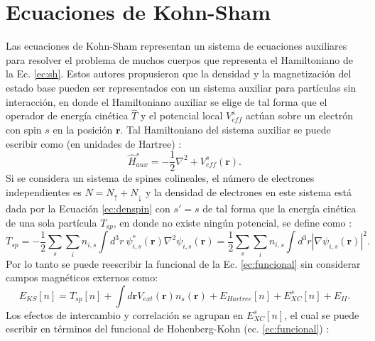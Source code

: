   \section{Ecuaciones de Kohn-Sham} \label{sec:KSH}
   Las ecuaciones de Kohn-Sham representan un sistema de ecuaciones auxiliares para resolver el problema de muchos cuerpos que representa el Hamiltoniano de la Ec. \ref{ec:sh}. Estos autores propusieron que la densidad y la magnetizaci\'on del estado base pueden ser representados con un sistema auxiliar para part\'iculas sin interacci\'on, en donde el Hamiltoniano auxiliar se elige de tal forma que el operador de  energ\'ia cin\'etica $ \hat{T}$ y el potencial local $ V_{eff}^s $ act\'uan sobre un electr\'on con spin $s$ en la posici\'on $\pmb{r}$. Tal Hamiltoniano del sistema auxiliar se puede escribir como (en unidades de Hartree) \cite{Martin-2004}:
  \begin{equation}
  \hat{H}_{aux}^{s} = - \frac{1}{2} \nabla^2 + V_{eff}^s (\pmb{r}). \label{ec:HAux}
  \end{equation}  
  Si se considera un sistema de spines colineales,  el n\'umero de electrones independientes es $N = N_{\uparrow}+ N_{\downarrow}$ y la densidad de electrones en este sistema est\'a dada por la Ecuaci\'on \ref{ec:denspin} con $s' = s$ de tal forma que la energ\'ia cin\'etica de una sola part\'icula $T_{sp}$, en donde no existe ning\'un potencial, se define como \cite{MB-2015}:
  \begin{equation}
  T_{sp} = -\frac{1}{2} \sum_{s} \sum_{i} n_{i,s} \int d^3 r ~\psi_{i,s }^* (\pmb{r}) \nabla^2 \psi_{i,s } (\pmb{r})  = \frac{1}{2} \sum_{s} \sum_{i} n_{i,s} \int d^3 r  |\nabla \psi_{i,s } (\pmb{r}) |^2 .\label{ec:funCinetica}
  \end{equation}
    Por lo tanto se puede reescribir la funcional de la Ec. \ref{ec:funcional} sin considerar campos magn\'eticos externos como: 
   \begin{equation}
   E_{KS}[n] = T_{sp}[n]+ \int d \pmb{r} V_{ext} (\pmb{r}) n_s (\pmb{r}) +E_{Hartree} [n] + E_{XC}^s [n] + E_{II}. \label{ec:funcHK}
   \end{equation}
    Los efectos de intercambio y correlaci\'on se agrupan en $E_{XC}^s [n]$, el cual se puede escribir en t\'erminos del funcional de Hohenberg-Kohn (ec. \ref{ec:funcional}) \cite{Martin-2004} :
